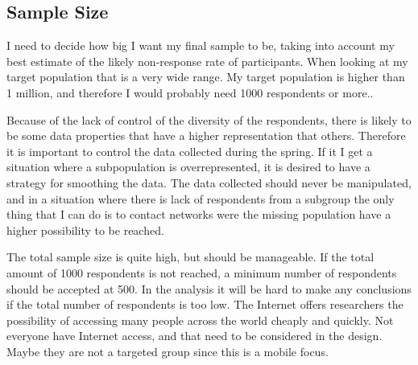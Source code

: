  \subsection{Sample Size} \label{sec:samplesize}

    I need to decide how big I want my final sample to be, taking into account my best estimate of the likely non-response rate of participants. When looking at my target population that is a very wide range. My target population is higher than 1 million, and therefore I would probably need 1000 respondents or more..

    Because of the lack of control of the diversity of the respondents, there is likely to be some data properties that have a higher representation that others. Therefore it is important to control the data collected during the spring. If it I get a situation where a subpopulation is overrepresented, it is desired to have a strategy for smoothing the data. The data collected should never be manipulated, and in a situation where there is lack of respondents from a subgroup the only thing that I can do is to contact networks were the missing population have a higher possibility to be reached.

    The total sample size is quite high, but should be manageable. If the total amount of 1000 respondents is not reached, a minimum number of respondents should be accepted at 500. In the analysis it will be hard to make any conclusions if the total number of respondents is too low.  The Internet offers researchers the possibility of accessing many people across the world cheaply and quickly. Not everyone have Internet access, and that need to be considered in the design. Maybe they are not a targeted group since this is a mobile focus.
